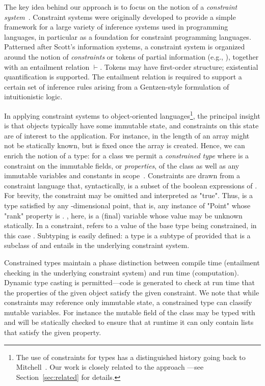 The key idea behind our approach is to focus on the notion of a
\emph{constraint system}~\cite{cccc}. Constraint systems were originally developed
to provide a simple framework for a large variety of
inference systems used in programming languages, in particular as a
foundation for constraint programming languages.  Patterned after
Scott's information systems, a constraint system is
organized around the notion of \emph{constraints} or tokens of partial
information (e.g., ), together with an entailment
relation $\vdash$.  Tokens may have first-order structure; existential
quantification is supported. The entailment relation is required to
support a certain set of inference rules arising from a Gentzen-style
formulation of intuitionistic logic.

In applying constraint systems to object-oriented
languages\footnote{The use of constraints for types has a
distinguished history going back to Mitchell~\cite{mitchell84}.
Our work is closely related to the \hmx{} approach
\cite{sulzmann97type}---see Section~\ref{sec:related} for
details.}, the principal insight
is that objects typically have some immutable state, and constraints on
this state are of interest to the application.  For instance, in \Java{}
the length of an array might not be statically known, but is fixed once
the array is created. Hence, we can enrich the notion of a type: for a
class  we permit a \emph{constrained type}  where 
is a
constraint on the immutable fields, or \emph{properties}, of the
class as well as any immutable variables and constants in
scope~\cite{constrained-types}.
Constraints are drawn from a constraint language that,
syntactically, is a subset of the boolean expressions of \Xten{}.  For
brevity, the constraint may be omitted and interpreted as \xcd"true".
Thus, 
 is a type satisfied by any
-dimensional point, that is, any
instance of \xcd"Point" whose \xcd"rank" property
is .  , here, is a (final) variable whose value may be unknown
statically. In a constraint,  refers to 
a value of the base type being constrained, in this case .
Subtyping is easily defined: a type  is a
subtype of  
provided that  is a subclass of  and 
entails  in the underlying constraint system.

Constrained types maintain a phase distinction between compile time
(entailment checking in the underlying constraint system) and run time
(computation).  Dynamic type casting is permitted---code is generated
to check at run time that the properties of the given object satisfy
the given constraint. We note that while constraints may reference
only immutable state, a constrained type can classify mutable
variables. For instance the mutable field  of the class
 may be typed with  and will be statically checked to ensure that at runtime it can only contain lists that satisfy the given property.


